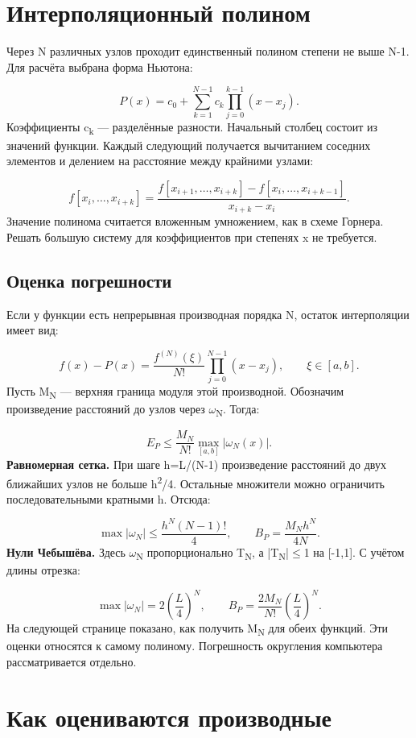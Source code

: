 \documentclass[12pt,a4paper]{article}
\begin{document}
\clearpage
\section{Интерполяционный полином}
Через N различных узлов проходит единственный полином степени не выше N-1. Для расчёта выбрана форма Ньютона:

\[
P(x)=c_0+\sum_{k=1}^{N-1}c_k\prod_{j=0}^{k-1}(x-x_j).
\]
Коэффициенты c\textsubscript{k} — разделённые разности. Начальный столбец состоит из значений функции. Каждый следующий получается вычитанием соседних элементов и делением на расстояние между крайними узлами:

\[
f[x_i,\ldots,x_{i+k}]=\frac{f[x_{i+1},\ldots,x_{i+k}]-f[x_i,\ldots,x_{i+k-1}]}{x_{i+k}-x_i}.
\]
Значение полинома считается вложенным умножением, как в схеме Горнера. Решать большую систему для коэффициентов при степенях x не требуется.

\subsection{Оценка погрешности}
Если у функции есть непрерывная производная порядка N, остаток интерполяции имеет вид:

\[
f(x)-P(x)=\frac{f^{(N)}(\xi)}{N!}\prod_{j=0}^{N-1}(x-x_j),\qquad \xi\in[a,b].
\]
Пусть M\textsubscript{N} — верхняя граница модуля этой производной. Обозначим произведение расстояний до узлов через \ensuremath{\omega}\textsubscript{N}. Тогда:

\[
E_P\leq\frac{M_N}{N!}\max_{[a,b]}|\omega_N(x)|.
\]
\textbf{Равномерная сетка.} При шаге h=L/(N-1) произведение расстояний до двух ближайших узлов не больше h\textsuperscript{2}/4. Остальные множители можно ограничить последовательными кратными h. Отсюда:

\[
\max|\omega_N|\leq\frac{h^N(N-1)!}{4},\qquad B_P=\frac{M_Nh^N}{4N}.
\]
\textbf{Нули Чебышёва.} Здесь \ensuremath{\omega}\textsubscript{N} пропорционально T\textsubscript{N}, а |T\textsubscript{N}|\ensuremath{\leq}1 на [-1,1]. С учётом длины отрезка:

\[
\max|\omega_N|=2\left(\frac{L}{4}\right)^N,\qquad B_P=\frac{2M_N}{N!}\left(\frac{L}{4}\right)^N.
\]
На следующей странице показано, как получить M\textsubscript{N} для обеих функций. Эти оценки относятся к самому полиному. Погрешность округления компьютера рассматривается отдельно.

\clearpage
\section{Как оцениваются производные}
\end{document}
